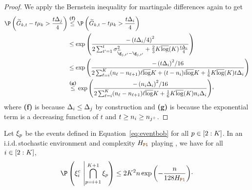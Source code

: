 \begin{proof}
\smallskip \noindent We apply the Bernstein inequality for martingale  differences  again to get
%
\begin{align*}
%
\Pro\left(\estCumulGainVector_{k,t} - t\mu_k >  \frac{t\gap_{j}}{4} \right)
&\stackrel{\textbf{(f)}}{\leq}
\Pro\left(\estCumulGainVector_{k,t} - t\mu_k >  \frac{t\gap_{i}}{4} \right)\\
&\leq
\exp\left(
\frac{-\left( t\gap_{i}/4\right)^2}{
	2\sum_{t'=1}^t \var_{\estGainVector_{j,t'}-\gainVector_{j,t'}}
	+
	\frac{2}{3}\nArms\bar\log(\nArms)\frac{t\gap_{i}}{4}
}
\right)\\
&\leq
\exp\left(
\frac{-\left(t\gap_{i}\right)^2\!/16}{
2	\sum_{\ell=i}^{\nArms}
	(\phaseTime_{\ell}-\phaseTime_{\ell+1})
	\ell\bar\log\nArms
	+
	(t-\phaseTime_{i})
	i\bar\log\nArms
	+
	\frac{1}{6}\nArms\bar\log(\nArms) t\gap_{i}
}
\right)\\
&\stackrel{\textbf{(g)}}{\leq}
\exp\left(
\frac{-\left(\phaseTime_{i}\gap_{i}\right)^2\!/16}{
	2\sum_{\ell=i}^{\nArms}
	(\phaseTime_{\ell}-\phaseTime_{\ell+1})
	\ell\bar\log\nArms
	+
	\frac{1}{6}\nArms\bar\log(\nArms)\phaseTime_{i}\gap_{i}
}
\right)\!\CommaBin
%
\end{align*}
%
where \textbf{(f)} is because $\Delta_{i}\leq\Delta_j$ by 
construction
and \textbf{(g)} is because the exponential term is a 
decreasing function of $t$ and $t\geq n_i\geq n_{j^+ }$.
%
\end{proof}			
\begin{lemma}\label{l:errPOGerrPO}
        Let $\xi_p$  be the events defined in Equation~\ref{eq:eventbob} for all $p\in[2:K]$.
	In an i.i.d.\,stochastic environment and complexity $\complexityProOne$ playing \Pone{}, we have for all $i\in[2:K]$, 
	\[
\Pro
\left(
\eventbob^c_{i}\ \middle| \bigcap_{p=i+1}^{\nArms+1} \eventbob_{p}
\right)
\leq
 2\nArms^2\timeHorizon
 \exp\left(-\frac{\timeHorizon}{128\complexityProOne}\right)\!\cdot
	\]
\end{lemma}
% 
